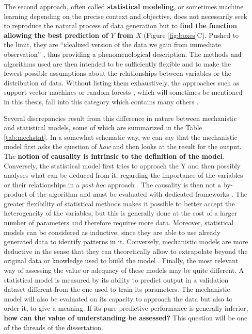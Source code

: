 \documentclass[a4paper,12pt,twoside,onecolumn,openright,final,oldfontcommands]{memoir}
\begin{document}
The second approach, often called \textbf{statistical modeling}, or
sometimes machine learning depending on the precise context and
objective, does not necessarily seek to reproduce the natural process of
data generation but to \textbf{find the function allowing the best
prediction of \(Y\) from \(X\)} (Figure \ref{fig:boxes}C). Pushed to the
limit, they are ``idealized version of the data we gain from immediate
observation'' \citep{frigg2020models}, thus providing a phenomenological
description. The methods and algorithms used are then intended to be
sufficiently flexible and to make the fewest possible assumptions about
the relationships between variables or the distribution of data. Without
listing them exhaustively, the approaches such as support vector
machines \citep{cortes1995support} or random forests
\citep{breiman2001random}, which will sometimes be mentioned in this
thesis, fall into this category which contains many others
\citep{hastie2009elements}.

Several discrepancies result from this difference in nature between
mechanistic and statistical models, some of which are summarized in the
Table \ref{tab:mechstat}. In a somewhat schematic way, we can say that
the mechanistic model first asks the question of \emph{how} and then
looks at the result for the output. The \textbf{notion of causality is
intrinsic to the definition of the model}. Conversely, the statistical
model first tries to approach the Y and then possibly analyses what can
be deduced from it, regarding the importance of the variables or their
relationships in a \emph{post hoc} approach
\citep{ishwaran2007variable, manica2019toward}. The causality is then
not a by-product of the algorithm and must be evaluated with dedicated
frameworks \citep{hernan2020causal}. The greater flexibility of
statistical methods makes it possible to better accept the heterogeneity
of the variables, but this is generally done at the cost of a larger
number of parameters and therefore requires more data. Moreover,
statistical models can be considered as inductive, since they are able
to use already generated data to identify patterns in it. Conversely,
mechanistic models are more deductive in the sense that they can
theoretically allow to extrapolate beyond the original data or knowledge
used to build the model \citep{baker2018mechanistic}. Finally, the most
relevant way of assessing the value or adequacy of these models may be
quite different. A statistical model is measured by its ability to
predict output in a validation dataset different from the one used to
train its parameters. The mechanistic model will also be evaluated on
its capacity to approach the data but also to order it, to give a
meaning. If its pure predictive performance is generally inferior,
\textbf{how can the value of understanding be assessed?} This question
will be one of the threads of the dissertation.
\end{document}
